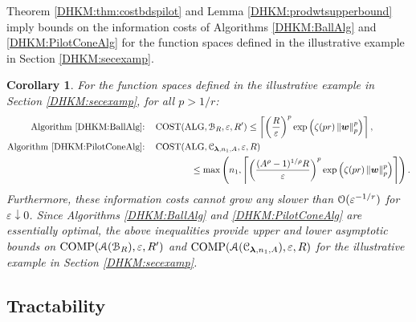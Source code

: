 \documentclass[USenglish]{article}
\theoremstyle{dgthm}
\theoremstyle{dgthm}
\theoremstyle{dgthm}
\newtheorem{corollary}[theorem]{Corollary}
\theoremstyle{dgthm}
\theoremstyle{dgdef}
\theoremstyle{definition}
\DeclareMathOperator{\ALG}{ALG}
\DeclareMathOperator{\COST}{COST}
\DeclareMathOperator{\COMP}{COMP}
\newcommand{\norm}[2][{}]{\ensuremath{\left \lVert #2 \right \rVert}_{#1}}
\begin{document}
{\bigskip

Theorem \ref{DHKM:thm:costbdspilot} and Lemma \ref{DHKM:prodwtsupperbound} imply bounds on the information costs of Algorithms \ref{DHKM:BallAlg} and \ref{DHKM:PilotConeAlg} for the function spaces defined in the illustrative example in Section \ref{DHKM:secexamp}.


\begin{corollary}\label{DHKM:cor:illex} 
For the function spaces defined in the illustrative example in Section \ref{DHKM:secexamp}, for all $p > 1/r$:
\begin{align*}
    \text{Algorithm \ref{DHKM:BallAlg}:} \quad& \COST(\ALG,\calB_R,\varepsilon, R') 
    \le \left \lceil  \left(\frac{R}{\varepsilon}\right)^p  \exp\left( \zeta(pr) \norm[p]{\bsw}^p  \right)    \right \rceil, \\
    \text{Algorithm \ref{DHKM:PilotConeAlg}:} \quad& \COST(\ALG,\calC_{\bslambda,n_1,A},\varepsilon, R) 
    \\ & \qquad \qquad \le \max \left( n_1, 
    \left \lceil  \left(\frac{(A^\rho-1)^{1/\rho}R}{\varepsilon}\right)^p  \exp\left( \zeta(pr) \norm[p]{\bsw}^p  \right)    \right \rceil \right).
    \end{align*}
Furthermore, these information costs cannot grow any slower than ${\mathcal{O}}(\varepsilon^{-1/r})$ for $\varepsilon \downarrow 0$. Since Algorithms \ref{DHKM:BallAlg} and \ref{DHKM:PilotConeAlg} are essentially optimal, the above inequalities provide upper and lower asymptotic bounds on  $\COMP(\calA(\calB_R),\varepsilon,R')$ and $\COMP(\calA(\calC_{\bslambda,n_1,A}),\varepsilon,R)$ for the illustrative example in Section \ref{DHKM:secexamp}.
\end{corollary}
}



\subsection{Tractability}\label{DHKM:SecPilotTract}
\end{document}
